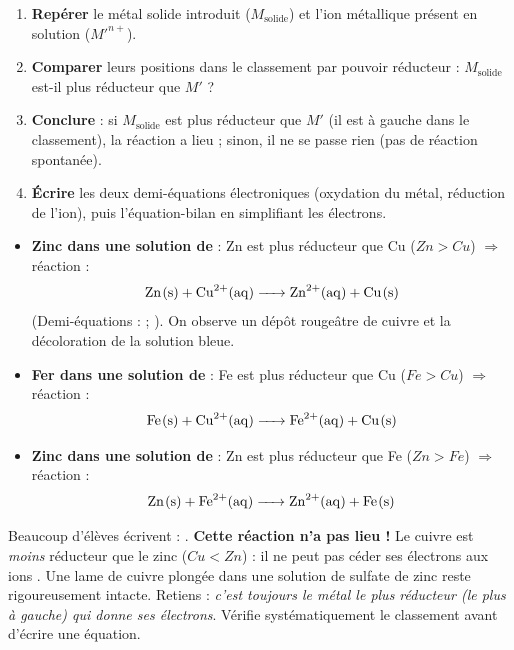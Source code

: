 \documentclass[11pt]{article}
\begin{document}
\begin{methode}
\begin{enumerate}
\item \textbf{Repérer} le métal solide introduit ($M_{\text{solide}}$) et l'ion métallique présent en solution ($M'^{n+}$).
\item \textbf{Comparer} leurs positions dans le classement par pouvoir réducteur : $M_{\text{solide}}$ est-il plus réducteur que $M'$ ?
\item \textbf{Conclure} : si $M_{\text{solide}}$ est plus réducteur que $M'$ (il est à gauche dans le classement), la réaction a lieu ; sinon, il ne se passe rien (pas de réaction spontanée).
\item \textbf{Écrire} les deux demi-équations électroniques (oxydation du métal, réduction de l'ion), puis l'équation-bilan en simplifiant les électrons.
\end{enumerate}
\end{methode}

\begin{exemplebox}
\begin{itemize}
\item \textbf{Zinc dans une solution de } : Zn est plus réducteur que Cu ($Zn > Cu$) $\Rightarrow$ réaction :
\[ \ce{Zn(s) + Cu^2+(aq) -> Zn^2+(aq) + Cu(s)} \]
(Demi-équations :  ; ). On observe un dépôt rougeâtre de cuivre et la décoloration de la solution bleue.
\item \textbf{Fer dans une solution de } : Fe est plus réducteur que Cu ($Fe > Cu$) $\Rightarrow$ réaction :
\[ \ce{Fe(s) + Cu^2+(aq) -> Fe^2+(aq) + Cu(s)} \]
\item \textbf{Zinc dans une solution de } : Zn est plus réducteur que Fe ($Zn > Fe$) $\Rightarrow$ réaction :
\[ \ce{Zn(s) + Fe^2+(aq) -> Zn^2+(aq) + Fe(s)} \]
\end{itemize}
\end{exemplebox}

\begin{attention}
Beaucoup d'élèves écrivent : . \textbf{Cette réaction n'a pas lieu !} Le cuivre est \emph{moins} réducteur que le zinc ($Cu < Zn$) : il ne peut pas céder ses électrons aux ions . Une lame de cuivre plongée dans une solution de sulfate de zinc reste rigoureusement intacte. Retiens : \emph{c'est toujours le métal le plus réducteur (le plus à gauche) qui donne ses électrons}. Vérifie systématiquement le classement avant d'écrire une équation.
\end{attention}
\end{document}
